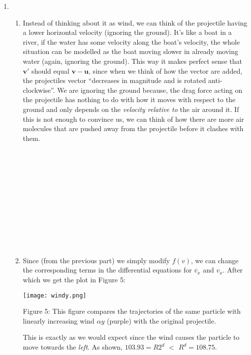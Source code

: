 \documentclass[11pt]{article}
\begin{document}
\begin{enumerate}
\item 
  \begin{enumerate}  
  \item Instead of thinking about it as wind, we can think of the projectile having a lower horizontal velocity (ignoring the ground). It's like a boat in a river, if the water has some velocity along the boat's velocity, the whole situation can be modelled as the boat moving slower in already moving water (again, ignoring the ground). This way it makes perfect sense that $\boldsymbol{v'}$ should equal $\boldsymbol{v} - \boldsymbol{u}$, since when we think of how the vector are added, the projectiles vector ``decreases in magnitude and is rotated anti-clockwise''. We are ignoring the ground because, the drag force acting on the projectile has nothing to do with how it moves with respect to the ground and only depends on the \emph{velocity relative to} the air around it. If this is not enough to convince us, we can think of how there are more air molecules that are pushed away from the projectile before it clashes with them.
   \\
   \\
   \\
   \\
   \\
   \\
   \\
   \\
   \\
   \\
   \\
   \\
  \item Since (from the previous part) we simply modify $f(v)$, we can change the corresponding terms in the differential equations for $\dot{v_x}$ and $v_x$. After which we get the plot in Figure 5:
  \begin{center}
    \texttt{[image: windy.png]}
  \end{center}
  \begin{center}
    \begin{changemargin}{3cm}{3cm}  
  Figure 5: This figure compares the trajectories of the same particle with linearly increasing wind $\alpha y$ (purple) with the original projectile.
    \end{changemargin}
  \end{center} 
  This is exactly as we would expect since the wind causes the particle to move towards the \emph{left}. As shown, $103.93 = R2^d$ $<$ $R^d = 108.75$. 
\end{enumerate}

\end{enumerate}
\end{document}
